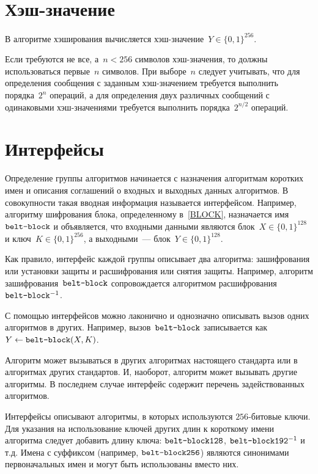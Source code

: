 \section{Хэш-значение}

В алгоритме хэширования вычисляется хэш-значение~$Y\in\{0,1\}^{256}$.

Если требуются не все, а~$n<256$ символов хэш-значения, 
то должны использоваться первые~$n$ символов.
%
При выборе~$n$ следует учитывать, 
что для определения сообщения с заданным хэш-значением
требуется выполнить порядка~$2^n$ операций,
а для определения двух различных сообщений
с одинаковыми хэш-значениями требуется выполнить
порядка~$2^{n/2}$ операций.

\section{Интерфейсы}\label{COMMON.IFace}

Определение группы алгоритмов начинается с назначения алгоритмам коротких 
имен и описания соглашений о входных и выходных данных алгоритмов.
В совокупности такая вводная информация называется интерфейсом.
%
Например, алгоритму шифрования блока, определенному в~\ref{BLOCK},
назначается имя~$\texttt{belt-block}$ и объявляется, что входными 
данными являются блок~$X\in\{0,1\}^{128}$ и ключ~$K\in\{0,1\}^{256}$,
а выходными~--- блок~$Y\in\{0,1\}^{128}$.

Как правило, интерфейс каждой группы описывает два алгоритма: зашифрования 
или установки защиты и расшифрования или снятия защиты. Например, 
алгоритм зашифрования~$\texttt{belt-block}$ сопровождается 
алгоритмом расшифрования~$\texttt{belt-block}^{-1}$.

С помощью интерфейсов можно лаконично и однозначно 
описывать вызов одних алгоритмов в других.
%        	
Например, вызов~$\texttt{belt-block}$ 
записывается как~$Y\leftarrow\texttt{belt-block}(X,K)$.

Алгоритм может вызываться в других алгоритмах настоящего стандарта или 
в алгоритмах других стандартов. И, наоборот, алгоритм может 
вызывать другие алгоритмы. В последнем случае интерфейс содержит перечень 
задействованных алгоритмов.

Интерфейсы описывают алгоритмы, в которых используются $256$-битовые 
ключи. Для указания на использование ключей других длин к короткому 
имени алгоритма следует добавить длину ключа:
$\texttt{belt-block128}$, $\texttt{belt-block192}^{-1}$ и т.д.
%
Имена с суффиксом  (например, $\texttt{belt-block256}$) 
являются синонимами первоначальных имен и могут быть использованы вместо них.

